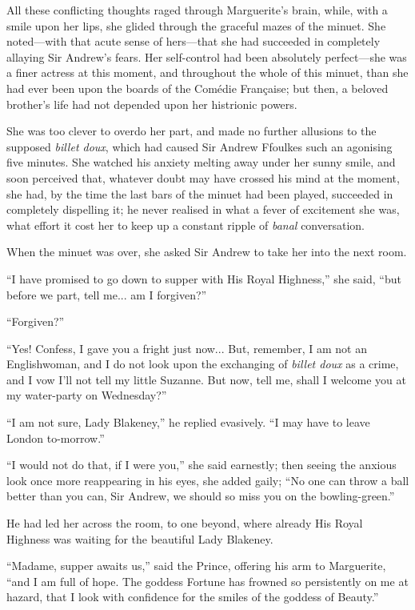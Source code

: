 \documentclass[paper=a5,BCOR=7mm,twoside,DIV=calc,12pt,usegeometry,chapterprefix,endperiod,headings=big]{scrbook}
\begin{document}
All these conflicting thoughts raged through Marguerite's brain, while, with a smile upon her lips, she glided through the graceful mazes of the minuet. She noted---with that acute sense of hers---that she had succeeded in completely allaying Sir Andrew's fears. Her self-control had been absolutely perfect---she was a finer actress at this moment, and throughout the whole of this minuet, than she had ever been upon the boards of the Comédie Française; but then, a beloved brother's life had not depended upon her histrionic powers.

She was too clever to overdo her part, and made no further allusions to the supposed \textit{billet doux}, which had caused Sir Andrew Ffoulkes such an agonising five minutes. She watched his anxiety melting away under her sunny smile, and soon perceived that, whatever doubt may have crossed his mind at the moment, she had, by the time the last bars of the minuet had been played, succeeded in completely dispelling it; he never realised in what a fever of excitement she was, what effort it cost her to keep up a constant ripple of \textit{banal} conversation.

When the minuet was over, she asked Sir Andrew to take her into the next room.

\enquote{I have promised to go down to supper with His Royal Highness,} she said, \enquote{but before we part, tell me... am I forgiven?}

\enquote{Forgiven?}

\enquote{Yes! Confess, I gave you a fright just now... But, remember, I am not an Englishwoman, and I do not look upon the exchanging of \textit{billet doux} as a crime, and I vow I'll not tell my little Suzanne. But now, tell me, shall I welcome you at my water-party on Wednesday?}

\enquote{I am not sure, Lady Blakeney,} he replied evasively. \enquote{I may have to leave London to-morrow.}

\enquote{I would not do that, if I were you,} she said earnestly; then seeing the anxious look once more reappearing in his eyes, she added gaily; \enquote{No one can throw a ball better than you can, Sir Andrew, we should so miss you on the bowling-green.}

He had led her across the room, to one beyond, where already His Royal Highness was waiting for the beautiful Lady Blakeney.

\enquote{Madame, supper awaits us,} said the Prince, offering his arm to Marguerite, \enquote{and I am full of hope. The goddess Fortune has frowned so persistently on me at hazard, that I look with confidence for the smiles of the goddess of Beauty.}
\end{document}
